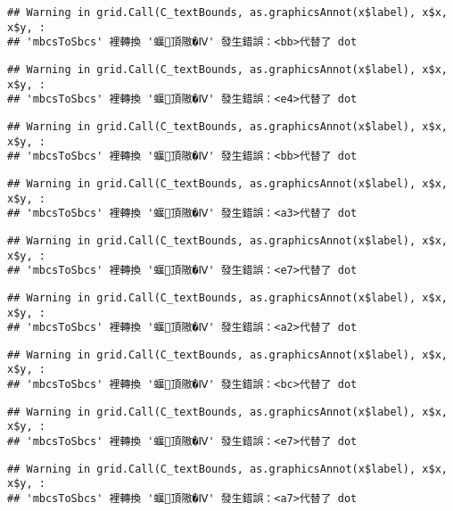 \documentclass[
]{article}
\begin{document}
\begin{verbatim}
## Warning in grid.Call(C_textBounds, as.graphicsAnnot(x$label), x$x, x$y, :
## 'mbcsToSbcs' 裡轉換 '蝘頂隞�Ⅳ' 發生錯誤：<bb>代替了 dot
\end{verbatim}

\begin{verbatim}
## Warning in grid.Call(C_textBounds, as.graphicsAnnot(x$label), x$x, x$y, :
## 'mbcsToSbcs' 裡轉換 '蝘頂隞�Ⅳ' 發生錯誤：<e4>代替了 dot
\end{verbatim}

\begin{verbatim}
## Warning in grid.Call(C_textBounds, as.graphicsAnnot(x$label), x$x, x$y, :
## 'mbcsToSbcs' 裡轉換 '蝘頂隞�Ⅳ' 發生錯誤：<bb>代替了 dot
\end{verbatim}

\begin{verbatim}
## Warning in grid.Call(C_textBounds, as.graphicsAnnot(x$label), x$x, x$y, :
## 'mbcsToSbcs' 裡轉換 '蝘頂隞�Ⅳ' 發生錯誤：<a3>代替了 dot
\end{verbatim}

\begin{verbatim}
## Warning in grid.Call(C_textBounds, as.graphicsAnnot(x$label), x$x, x$y, :
## 'mbcsToSbcs' 裡轉換 '蝘頂隞�Ⅳ' 發生錯誤：<e7>代替了 dot
\end{verbatim}

\begin{verbatim}
## Warning in grid.Call(C_textBounds, as.graphicsAnnot(x$label), x$x, x$y, :
## 'mbcsToSbcs' 裡轉換 '蝘頂隞�Ⅳ' 發生錯誤：<a2>代替了 dot
\end{verbatim}

\begin{verbatim}
## Warning in grid.Call(C_textBounds, as.graphicsAnnot(x$label), x$x, x$y, :
## 'mbcsToSbcs' 裡轉換 '蝘頂隞�Ⅳ' 發生錯誤：<bc>代替了 dot
\end{verbatim}

\begin{verbatim}
## Warning in grid.Call(C_textBounds, as.graphicsAnnot(x$label), x$x, x$y, :
## 'mbcsToSbcs' 裡轉換 '蝘頂隞�Ⅳ' 發生錯誤：<e7>代替了 dot
\end{verbatim}

\begin{verbatim}
## Warning in grid.Call(C_textBounds, as.graphicsAnnot(x$label), x$x, x$y, :
## 'mbcsToSbcs' 裡轉換 '蝘頂隞�Ⅳ' 發生錯誤：<a7>代替了 dot
\end{verbatim}
\end{document}
